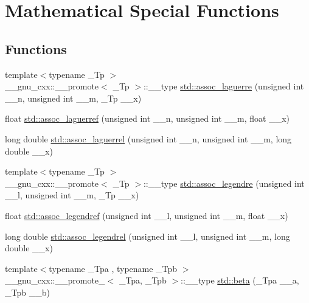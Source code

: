 \hypertarget{group__tr29124__math__spec__func}{}\section{Mathematical Special Functions}
\label{group__tr29124__math__spec__func}
\subsection*{Functions}
\begin{DoxyCompactItemize}
\item 
{\footnotesize template$<$typename \+\_\+\+Tp $>$ }\\\+\_\+\+\_\+gnu\+\_\+cxx\+::\+\_\+\+\_\+promote$<$ \+\_\+\+Tp $>$\+::\+\_\+\+\_\+type \hyperlink{group__tr29124__math__spec__func_ga377bb7e038c464a27dfe0573fd2d7b33}{std\+::assoc\+\_\+laguerre} (unsigned int \+\_\+\+\_\+n, unsigned int \+\_\+\+\_\+m, \+\_\+\+Tp \+\_\+\+\_\+x)
\item 
float \hyperlink{group__tr29124__math__spec__func_gaf83d98f350a1cfcebee6a1f723cf90d2}{std\+::assoc\+\_\+laguerref} (unsigned int \+\_\+\+\_\+n, unsigned int \+\_\+\+\_\+m, float \+\_\+\+\_\+x)
\item 
long double \hyperlink{group__tr29124__math__spec__func_gac8e245671fb2df5de5fd978d03081f6c}{std\+::assoc\+\_\+laguerrel} (unsigned int \+\_\+\+\_\+n, unsigned int \+\_\+\+\_\+m, long double \+\_\+\+\_\+x)
\item 
{\footnotesize template$<$typename \+\_\+\+Tp $>$ }\\\+\_\+\+\_\+gnu\+\_\+cxx\+::\+\_\+\+\_\+promote$<$ \+\_\+\+Tp $>$\+::\+\_\+\+\_\+type \hyperlink{group__tr29124__math__spec__func_ga355349f79119c1fd1e2a9351cec57f0f}{std\+::assoc\+\_\+legendre} (unsigned int \+\_\+\+\_\+l, unsigned int \+\_\+\+\_\+m, \+\_\+\+Tp \+\_\+\+\_\+x)
\item 
float \hyperlink{group__tr29124__math__spec__func_ga3ced07ddd24bf4af56e2712d148e7f57}{std\+::assoc\+\_\+legendref} (unsigned int \+\_\+\+\_\+l, unsigned int \+\_\+\+\_\+m, float \+\_\+\+\_\+x)
\item 
long double \hyperlink{group__tr29124__math__spec__func_ga55977b425a539146f060dec1c8003344}{std\+::assoc\+\_\+legendrel} (unsigned int \+\_\+\+\_\+l, unsigned int \+\_\+\+\_\+m, long double \+\_\+\+\_\+x)
\item 
{\footnotesize template$<$typename \+\_\+\+Tpa , typename \+\_\+\+Tpb $>$ }\\\+\_\+\+\_\+gnu\+\_\+cxx\+::\+\_\+\+\_\+promote\+\_$<$ \+\_\+\+Tpa, \+\_\+\+Tpb $>$\+::\+\_\+\+\_\+type \hyperlink{group__tr29124__math__spec__func_ga6a7220c87c942db48b18b527d92bbd2d}{std\+::beta} (\+\_\+\+Tpa \+\_\+\+\_\+a, \+\_\+\+Tpb \+\_\+\+\_\+b)

\end{DoxyCompactItemize}

